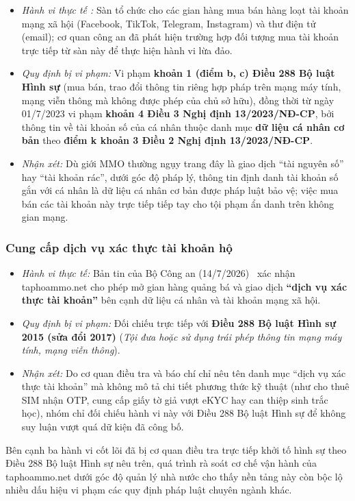 \begin{itemize}
\item \textit{Hành vi thực tế :} Sàn tổ chức cho các gian hàng mua bán hàng loạt tài khoản mạng xã hội (Facebook, TikTok, Telegram, Instagram) và thư điện tử (email); cơ quan công an đã phát hiện trường hợp đối tượng mua tài khoản trực tiếp từ sàn này để thực hiện hành vi lừa đảo.
\item \textit{Quy định bị vi phạm:} Vi phạm \textbf{khoản 1 (điểm b, c) Điều 288 Bộ luật Hình sự} (mua bán, trao đổi thông tin riêng hợp pháp trên mạng máy tính, mạng viễn thông mà không được phép của chủ sở hữu), đồng thời từ ngày 01/7/2023 vi phạm \textbf{khoản 4 Điều 3 Nghị định 13/2023/NĐ-CP}, bởi thông tin về tài khoản số của cá nhân thuộc danh mục \textbf{dữ liệu cá nhân cơ bản} theo \textbf{điểm k khoản 3 Điều 2 Nghị định 13/2023/NĐ-CP}.
\item \textit{Nhận xét:} Dù giới MMO thường ngụy trang đây là giao dịch “tài nguyên số” hay “tài khoản rác”, dưới góc độ pháp lý, thông tin định danh tài khoản số gắn với cá nhân là dữ liệu cá nhân cơ bản được pháp luật bảo vệ; việc mua bán các tài khoản này trực tiếp tiếp tay cho tội phạm ẩn danh trên không gian mạng.
\end{itemize}
\subsubsection{Cung cấp dịch vụ xác thực tài khoản hộ}\label{sec:3.1.3}

\begin{itemize}
\item \textit{Hành vi thực tế:} Bản tin của Bộ Công an (14/7/2026)~\cite{bca-2026} xác nhận taphoammo.net cho phép mở gian hàng quảng bá và giao dịch \textbf{“dịch vụ xác thực tài khoản”} bên cạnh dữ liệu cá nhân và tài khoản mạng xã hội.
\item \textit{Quy định bị vi phạm:} Đối chiếu trực tiếp với \textbf{Điều 288 Bộ luật Hình sự 2015 (sửa đổi 2017)} (\textit{Tội đưa hoặc sử dụng trái phép thông tin mạng máy tính, mạng viễn thông}).
\item \textit{Nhận xét:} Do cơ quan điều tra và báo chí chỉ nêu tên danh mục “dịch vụ xác thực tài khoản” mà không mô tả chi tiết phương thức kỹ thuật (như cho thuê SIM nhận OTP, cung cấp giấy tờ giả vượt eKYC hay can thiệp sinh trắc học), nhóm chỉ đối chiếu hành vi này với Điều 288 Bộ luật Hình sự để không suy luận vượt quá dữ kiện đã công bố.
\end{itemize}
Bên cạnh ba hành vi cốt lõi đã bị cơ quan điều tra trực tiếp khởi tố hình sự theo Điều 288 Bộ luật Hình sự nêu trên, quá trình rà soát cơ chế vận hành của taphoammo.net dưới góc độ quản lý nhà nước cho thấy nền tảng này còn bộc lộ nhiều dấu hiệu vi phạm các quy định pháp luật chuyên ngành khác.

